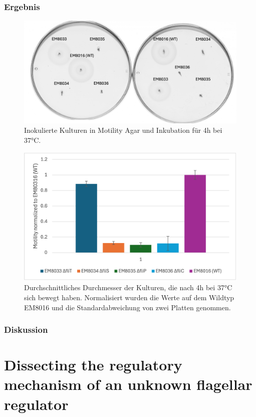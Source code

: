 \documentclass[oneside,10pt,a4paper]{report}
\begin{document}
			\subsection{Ergebnis}
			\begin{figure}[H]
				\centering
				\includegraphics[scale=0.5]{Exp6motility.png}
				\caption{Inokulierte Kulturen in Motility Agar und Inkubation für 4h bei 37°C.}
				\label{fig: Motilitybild}
			\end{figure}
			\begin{figure}[H]
				\centering
				\includegraphics[scale=0.7]{motilitybar.png}
				\caption{Durchschnittliches Durchmesser der Kulturen, die nach 4h bei 37°C sich bewegt haben. Normalisiert wurden die Werte auf dem Wildtyp EM8016 und die Standardabweichung von zwei Platten genommen.}
				\label{fig: Motilitychart}
			\end{figure}
			
			\subsection{Diskussion}
		
		
	\chapter{Dissecting the regulatory mechanism of an unknown flagellar regulator}
\end{document}
